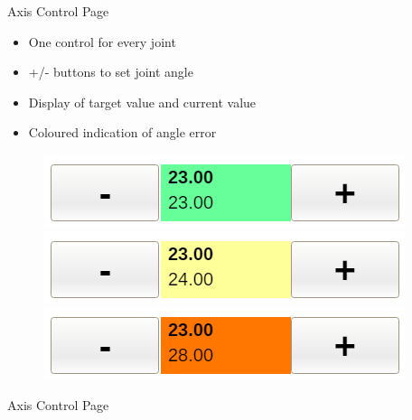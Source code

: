 \documentclass[t]{beamer}
\begin{document}
\begin{frame}{Axis Control Page}
\begin{minipage}{0.55\linewidth}
\begin{itemize}
	\item One control for every joint
	\item +/- buttons to set joint angle
	\item Display of target value and current value
	\item Coloured indication of angle error
\end{itemize}
\end{minipage}
\begin{minipage}{0.4\linewidth}
	\begin{figure}
		\includegraphics[width=\linewidth]{assets/chpt_concepts/AxisControlGreen.png}
		
		\includegraphics[width=\linewidth]{assets/chpt_concepts/AxisControlYellow.png}
		
		\includegraphics[width=\linewidth]{assets/chpt_concepts/AxisControlRed.png}
	\end{figure}
\end{minipage}
\end{frame}

\begin{frame}{Axis Control Page}
\begin{figure}
\end{figure}
\end{frame}
\end{document}
